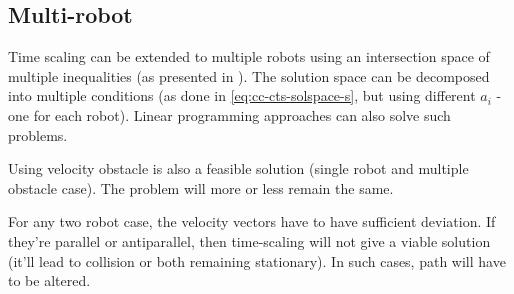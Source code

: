 \subsection{Multi-robot}

Time scaling can be extended to multiple robots using an intersection space of multiple inequalities (as presented in \cite{rca-multirobot-rrc}). The solution space can be decomposed into multiple conditions (as done in \ref{eq:cc-cts-solspace-s}, but using different $a_i$ - one for each robot). 
Linear programming approaches can also solve such problems.

Using velocity obstacle \cite{fiorini98-vel-obs} is also a feasible solution (single robot and multiple obstacle case). The problem will more or less remain the same.

For any two robot case, the velocity vectors have to have sufficient deviation. If they're parallel or antiparallel, then time-scaling will not give a viable solution (it'll lead to collision or both remaining stationary). In such cases, path will have to be altered.
